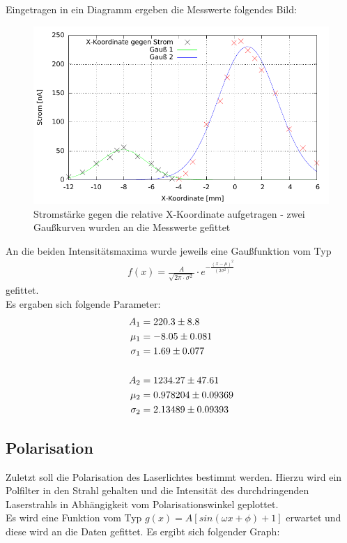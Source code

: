 Eingetragen in ein Diagramm ergeben die Messwerte folgendes Bild:
\begin{figure}[H]
\includegraphics[scale=0.8]{../gnu/Draht.pdf}
\caption{Stromstärke gegen die relative X-Koordinate aufgetragen - zwei Gaußkurven wurden an die Messwerte gefittet}
\label{pic_mode}
\end{figure}

An die beiden Intensitätsmaxima wurde jeweils eine Gaußfunktion vom Typ 
\begin{align*}
f(x)=\frac{A}{\sqrt{2\pi \cdot \sigma ^2}} \cdot e^{-\frac{(x-\mu )^2}{(2\sigma^2)}}
\end{align*}
gefittet.\\
Es ergaben sich folgende Parameter:
\begin{align*}
A_1&= 220.3 		\pm 	8.8       	\\
\mu_1 &=-8.05	\pm	 	0.081    	\\
\sigma_1&=1.69    \pm		0.077    \\
\vspace{0.5cm}\\
A_2&=1234.27          \pm 47.61	\\
\mu_2 &=0.978204         \pm 0.09369	\\
\sigma_2&=2.13489         \pm 0.09393
\end{align*}

\subsection{Polarisation}
Zuletzt soll die Polarisation des Laserlichtes bestimmt werden. Hierzu wird ein Polfilter in den Strahl gehalten und die Intensität des durchdringenden Laserstrahls in Abhängigkeit vom Polarisationswinkel geplottet.\\
Es wird eine Funktion vom Typ $g(x)=A\left[sin(\omega x+\phi)+1\right]$ erwartet und diese wird an die Daten gefittet. Es ergibt sich folgender Graph:

